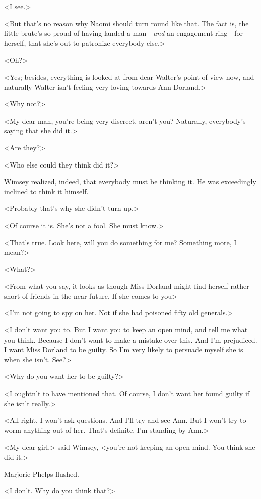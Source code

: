 <I see.>

<But that's no reason why Naomi should turn round like that. The fact is, the little brute's so proud of having landed a man—\emph{and} an engagement ring—for herself, that she's out to patronize everybody else.>

<Oh?>

<Yes; besides, everything is looked at from dear Walter's point of view now, and naturally Walter isn't feeling very loving towards Ann Dorland.>

<Why not?>

<My dear man, you're being very discreet, aren't you? Naturally, everybody's saying that she did it.>

<Are they?>

<Who else could they think did it?>

Wimsey realized, indeed, that everybody must be thinking it. He was exceedingly inclined to think it himself.

<Probably that's why she didn't turn up.>

<Of course it is. She's not a fool. She must know.>

<That's true. Look here, will you do something for me? Something more, I mean?>

<What?>

<From what you say, it looks as though Miss Dorland might find herself rather short of friends in the near future. If she comes to you\longdots>

<I'm not going to spy on her. Not if she had poisoned fifty old generals.>

<I don't want you to. But I want you to keep an open mind, and tell me what you think. Because I don't want to make a mistake over this. And I'm prejudiced. I want Miss Dorland to be guilty. So I'm very likely to persuade myself she is when she isn't. See?>

<Why do you want her to be guilty?>

<I oughtn't to have mentioned that. Of course, I don't want her found guilty if she isn't really.>

<All right. I won't ask questions. And I'll try and see Ann. But I won't try to worm anything out of her. That's definite. I'm standing by Ann.>

<My dear girl,> said Wimsey, <you're not keeping an open mind. You think she did it.>

Marjorie Phelps flushed.

<I don't. Why do you think that?>

